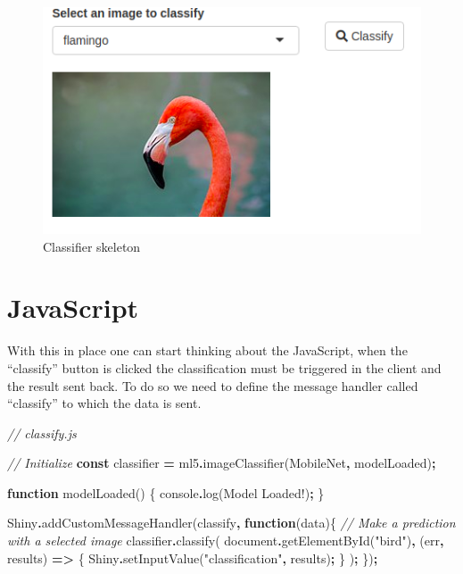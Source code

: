 \documentclass[
]{krantz}
\makeatletter
\newenvironment{Shaded}{\begin{snugshade}}{\end{snugshade}}
\newcommand{\BuiltInTok}[1]{#1}
\newcommand{\CommentTok}[1]{\textcolor[rgb]{0.37,0.37,0.37}{\textit{#1}}}
\newcommand{\FunctionTok}[1]{\textcolor[rgb]{0,0,0}{#1}}
\newcommand{\KeywordTok}[1]{\textcolor[rgb]{0.27,0.27,0.27}{\textbf{#1}}}
\newcommand{\NormalTok}[1]{#1}
\newcommand{\OperatorTok}[1]{\textcolor[rgb]{0.43,0.43,0.43}{\textbf{#1}}}
\newcommand{\StringTok}[1]{\textcolor[rgb]{0.5,0.5,0.5}{#1}}
\newenvironment{kframe}{%
\medskip{}
\setlength{\fboxsep}{.8em}
 \def\at@end@of@kframe{}%
 \ifinner\ifhmode%
  \def\at@end@of@kframe{\end{minipage}}%
  \begin{minipage}{\columnwidth}%
 \fi\fi%
 \def\FrameCommand##1{\hskip\@totalleftmargin \hskip-\fboxsep
 \colorbox{shadecolor}{##1}\hskip-\fboxsep
     \hskip-\linewidth \hskip-\@totalleftmargin \hskip\columnwidth}%
 \MakeFramed {\advance\hsize-\width
   \@totalleftmargin\z@ \linewidth\hsize
   \@setminipage}}%
 {\par\unskip\endMakeFramed%
 \at@end@of@kframe}
\renewenvironment{Shaded}{\begin{kframe}}{\end{kframe}}
\makeatother
\begin{document}
\begin{figure}
\centering
\includegraphics{images/ml5-init.png}
\caption{Classifier skeleton}
\end{figure}

\hypertarget{v8-img-javascript}{%
\section{JavaScript}\label{v8-img-javascript}}

With this in place one can start thinking about the JavaScript, when the ``classify'' button is clicked the classification must be triggered in the client and the result sent back. To do so we need to define the message handler called ``classify'' to which the data is sent.

\begin{Shaded}
\begin{Highlighting}[]
\CommentTok{// classify.js}

\CommentTok{// Initialize }
\KeywordTok{const}\NormalTok{ classifier }\OperatorTok{=}\NormalTok{ ml5}\OperatorTok{.}\FunctionTok{imageClassifier}\NormalTok{(}\StringTok{\textquotesingle{}MobileNet\textquotesingle{}}\OperatorTok{,}\NormalTok{ modelLoaded)}\OperatorTok{;}

\KeywordTok{function} \FunctionTok{modelLoaded}\NormalTok{() \{}
  \BuiltInTok{console}\OperatorTok{.}\FunctionTok{log}\NormalTok{(}\StringTok{\textquotesingle{}Model Loaded!\textquotesingle{}}\NormalTok{)}\OperatorTok{;}
\NormalTok{\}}

\NormalTok{Shiny}\OperatorTok{.}\FunctionTok{addCustomMessageHandler}\NormalTok{(}\StringTok{\textquotesingle{}classify\textquotesingle{}}\OperatorTok{,} \KeywordTok{function}\NormalTok{(data)\{}
  \CommentTok{// Make a prediction with a selected image}
\NormalTok{  classifier}\OperatorTok{.}\FunctionTok{classify}\NormalTok{(}
    \BuiltInTok{document}\OperatorTok{.}\FunctionTok{getElementById}\NormalTok{(}\StringTok{"bird"}\NormalTok{)}\OperatorTok{,}\NormalTok{ (err}\OperatorTok{,}\NormalTok{ results) }\KeywordTok{=\textgreater{}}\NormalTok{ \{}
\NormalTok{      Shiny}\OperatorTok{.}\FunctionTok{setInputValue}\NormalTok{(}\StringTok{"classification"}\OperatorTok{,}\NormalTok{ results)}\OperatorTok{;}
\NormalTok{    \}}
\NormalTok{  )}\OperatorTok{;}
\NormalTok{\})}\OperatorTok{;}
\end{Highlighting}
\end{Shaded}
\end{document}
